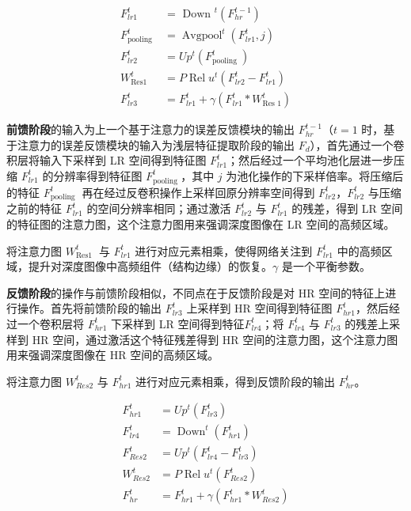 \documentclass[14px]{article}
\begin{document}
\begin{equation}
\begin{aligned}
F_{l r 1}^{t} &=\text { Down }^{t}\left(F_{h r}^{t-1}\right)\\
F_{\text {pooling }}^{t} &=\operatorname{Avgpool}^{t}\left(F_{l r 1}^{t}, j\right)\\
F_{l r 2}^{t} &=U p^{t}\left(F_{\text {pooling }}^{t}\right)\\
W_{\text {Res1 }}^{t} &=P \operatorname{Rel} u^{t}\left(F_{l r 2}^{t}-F_{l r 1}^{t}\right)\\
F_{l r 3}^{t} &=F_{l r 1}^{t}+\gamma\left(F_{l r 1}^{t} * W_{\text {Res } 1}^{t}\right)
\end{aligned}
\end{equation}

\textbf{前馈阶段}的输入为上一个基于注意力的误差反馈模块的输出 $F_{h r}^{t-1}$（$t=1$ 时，基于注意力的误差反馈模块的输入为浅层特征提取阶段的输出 $F_d$），首先通过一个卷积层将输入下采样到 LR 空间得到特征图 $F_{l r 1}^{t}$；然后经过一个平均池化层进一步压缩 $F_{l r 1}^{t}$ 的分辨率得到特征图 $F_{\text {pooling }}^{t} $，其中 $j$ 为池化操作的下采样倍率。将压缩后的特征 $F_{\text {pooling }}^{t} $ 再在经过反卷积操作上采样回原分辨率空间得到 $F_{l r 2}^{t}$，$F_{l r 2}^{t}$ 与压缩之前的特征 $F_{l r 1}^{t}$ 的空间分辨率相同；通过激活 $F_{l r 2}^{t}$ 与 $F_{l r 1}^{t}$ 的残差，得到 LR 空间的特征图的注意力图，这个注意力图用来强调深度图像在 LR 空间的高频区域。

将注意力图 $W_{\text {Res1 }}^{t}$ 与 $F_{l r 1}^{t}$ 进行对应元素相乘，使得网络关注到 $F_{l r 1}^{t}$ 中的高频区域，提升对深度图像中高频组件（结构边缘）的恢复。$\gamma$ 是一个平衡参数。

\textbf{反馈阶段}的操作与前馈阶段相似，不同点在于反馈阶段是对 HR 空间的特征上进行操作。首先将前馈阶段的输出 $F_{l r 3}^{t}$ 上采样到 HR 空间得到特征图 $F_{h r 1}^{t}$，然后经过一个卷积层将 $F_{h r 1}^{t}$ 下采样到 LR 空间得到特征$F_{l r 4}^{t}$；将 $F_{l r 4}^{t}$ 与 $F_{l r 3}^{t}$ 的残差上采样到 HR 空间，通过激活这个特征残差得到 HR 空间的注意力图，这个注意力图用来强调深度图像在 HR 空间的高频区域。

将注意力图 $W_{R e s 2}^{t}$ 与 $F_{h r 1}^{t}	$ 进行对应元素相乘，得到反馈阶段的输出 $F_{h r}^{t}$。

\begin{equation}
\begin{aligned}
F_{h r 1}^{t} &=U p^{t}\left(F_{l r 3}^{t}\right) \\
F_{l r 4}^{t} &=\operatorname{Down}^{t}\left(F_{h r 1}^{t}\right) \\
F_{R e s 2}^{t} &=U p^{t}\left(F_{l r 4}^{t}-F_{l r 3}^{t}\right) \\
W_{R e s 2}^{t} &=P \operatorname{Rel} u^{t}\left(F_{R e s 2}^{t}\right) \\
F_{h r}^{t} &=F_{h r 1}^{t}+\gamma\left(F_{h r 1}^{t} * W_{R e s 2}^{t}\right)
\end{aligned}
\end{equation}
\end{document}
